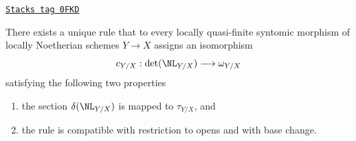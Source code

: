\begin{proposition}
\label{discriminant-proposition-tate-map}
\href{https://stacks.math.columbia.edu/tag/0FKD}{\texttt{Stacks tag 0FKD}}

There exists a unique rule that to every locally quasi-finite syntomic
morphism of locally Noetherian schemes $Y \to X$ assigns an isomorphism
$$
c_{Y/X} : \det(\NL_{Y/X}) \longrightarrow \omega_{Y/X}
$$
satisfying the following two properties
\begin{enumerate}
\item the section $\delta(\NL_{Y/X})$ is mapped to $\tau_{Y/X}$, and
\item the rule is compatible with restriction to opens and with
base change.
\end{enumerate}
\end{proposition}

